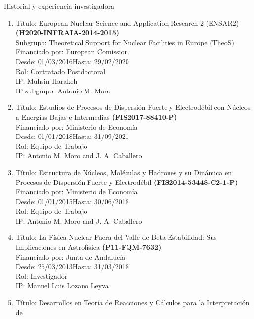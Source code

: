 \documentclass{resume2} %
\begin{document}
\begin{rSection}{Historial y experiencia investigadora}
\begin{enumerate}[label=\alph*.]
\begin{enumerate}[label=\arabic*.]
{\sc IP}: Manuela Rodr\'iguez Gallardo\\
\item {\sc T\'itulo}: European Nuclear Science and Application Research 2 (ENSAR2)
{\bf(H2020-INFRAIA-2014-2015)}\\
{\sc Subgrupo}: Theoretical Support for Nuclear Facilities in Europe (TheoS)\\
{\sc Financiado por}: European Comission.\\
{\sc Desde}: 01/03/2016\hfill {\sc Hasta}: 29/02/2020\\
{\sc Rol}: Contratado Postdoctoral\\
{\sc IP}: Muhsin Harakeh\\
{\sc IP subgrupo}: Antonio M. Moro\\
\item {\sc T\'itulo}: Estudios de Procesos de Dispersi\'on Fuerte y Electrod\'ebil con N\'ucleos
a Energ\'ias Bajas e Intermedias {\bf (FIS2017-88410-P)}\\
{\sc Financiado por}: Ministerio de Economía\\
{\sc Desde}: 01/01/2018\hfill {\sc Hasta}: 31/09/2021\\
{\sc Rol}: Equipo de Trabajo\\
{\sc IP}: Antonio M. Moro and J. A. Caballero\\
\item {\sc T\'itulo}: Estructura de N\'ucleos, Mol\'eculas y Hadrones y su Din\'amica en Procesos de
Dispersi\'on Fuerte y Electrod\'ebil {\bf (FIS2014-53448-C2-1-P)}\\
{\sc Financiado por}: Ministerio de Econom\'ia\\
{\sc Desde}: 01/01/2015\hfill {\sc Hasta}: 30/06/2018\\
{\sc Rol}: Equipo de Trabajo\\
{\sc IP}: Antonio M. Moro and J. A. Caballero\\
\item {\sc T\'itulo}:  La F\'isica Nuclear Fuera del Valle de Beta-Estabilidad: Sus Implicaciones en
Astrof\'isica {\bf (P11-FQM-7632)}\\
{\sc Financiado por}: Junta de Andaluc\'ia\\
{\sc Desde}: 26/03/2013\hfill {\sc Hasta}: 31/03/2018\\
{\sc Rol}: Investigador\\
{\sc IP}: Manuel Luis Lozano Leyva\\
\item {\sc T\'itulo}:  Desarrollos en Teor\'ia de Reacciones y C\'alculos para la Interpretaci\'on de

\end{enumerate}
\end{enumerate}
\end{rSection}
\end{document}
